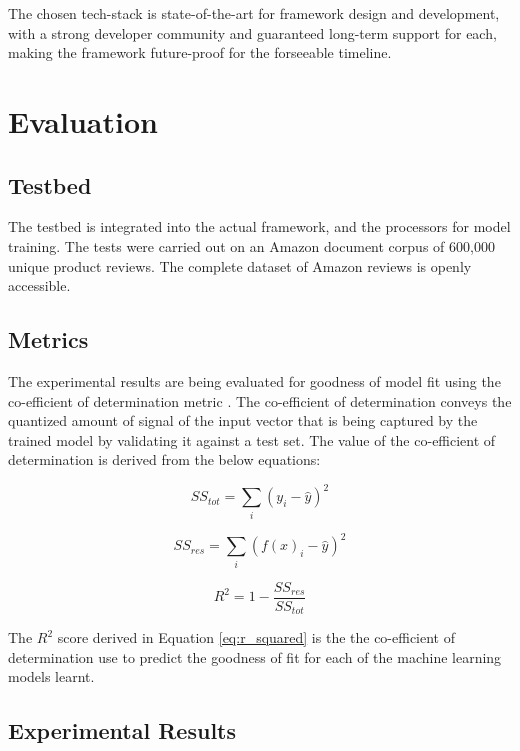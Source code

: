 \documentclass[conference]{IEEEtran}
\begin{document}
The chosen tech-stack is state-of-the-art for framework design and development, with a strong developer community and guaranteed long-term support for each, making the framework future-proof for the forseeable timeline.

\vspace{5mm}

\section{Evaluation}

\subsection{Testbed}
The testbed is integrated into the actual framework, and the processors for model training.
The tests were carried out on an Amazon document corpus of 600,000 unique product reviews.
The complete dataset of Amazon reviews is openly accessible\cite{amazon_datasets}.

\subsection{Metrics}
The experimental results are being evaluated for goodness of model fit using the co-efficient of determination metric \cite{jaeger1990statistics}.
The co-efficient of determination conveys the quantized amount of signal of the input vector that is being captured by the trained model by validating it against a test set. 
The value of the co-efficient of determination is derived from the below equations:

\begin{equation}
\displaystyle SS_{tot} = \sum_{i} (y_i - \hat{y})^2
\end{equation}

\begin{equation}
\displaystyle SS_{res} = \sum_{i} (f(x)_i - \hat{y})^2
\end{equation}

\begin{equation} \label{eq:r_squared}
\displaystyle R^2 = 1 - \frac{SS_{res}}{SS_{tot}}
\end{equation}

The $R^2$ score derived in Equation \ref{eq:r_squared} is the the co-efficient of determination use to predict the goodness of fit for each of the machine learning models learnt.


\subsection{Experimental Results}
\end{document}
